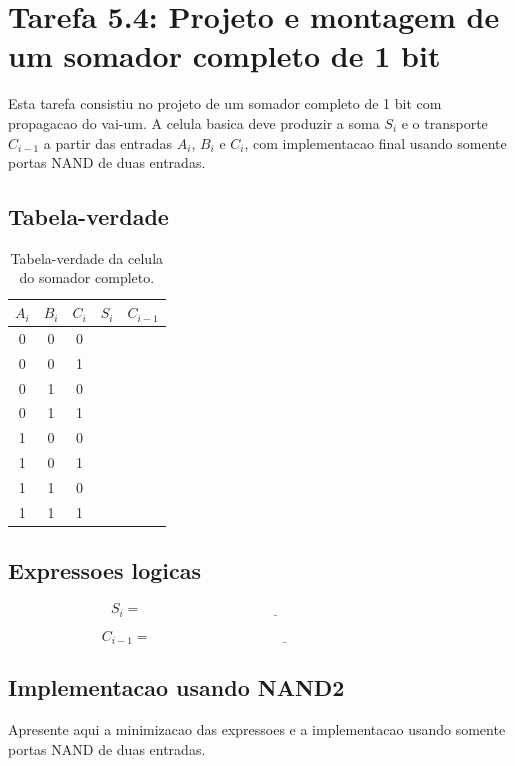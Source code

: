 \section{Tarefa 5.4: Projeto e montagem de um somador completo de 1 bit}

Esta tarefa consistiu no projeto de um somador completo de 1 bit com propagacao do vai-um. A celula basica deve produzir a soma $S_i$ e o transporte $C_{i-1}$ a partir das entradas $A_i$, $B_i$ e $C_i$, com implementacao final usando somente portas NAND de duas entradas.

\subsection{Tabela-verdade}

\begin{table}[H]
    \centering
    \caption{Tabela-verdade da celula do somador completo.}
    \begin{tabular}{ccccc}
        \toprule
        $A_i$ & $B_i$ & $C_i$ & $S_i$ & $C_{i-1}$ \\
        \midrule
        0 & 0 & 0 & & \\
        0 & 0 & 1 & & \\
        0 & 1 & 0 & & \\
        0 & 1 & 1 & & \\
        1 & 0 & 0 & & \\
        1 & 0 & 1 & & \\
        1 & 1 & 0 & & \\
        1 & 1 & 1 & & \\
        \bottomrule
    \end{tabular}
\end{table}

\subsection{Expressoes logicas}

\[
S_i = \underline{\hspace{8cm}}
\]

\[
C_{i-1} = \underline{\hspace{8cm}}
\]

\subsection{Implementacao usando NAND2}

Apresente aqui a minimizacao das expressoes e a implementacao usando somente portas NAND de duas entradas.

